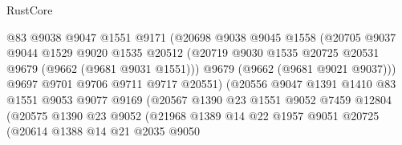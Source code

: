 \begin{lexlean}{RustCore}
\begin{coremodule}
                              @83
                              @9038
                              @9047
                              @1551
                              @9171
                              (@20698
                                @9038
                                @9045
                                @1558
                                (@20705
                                  @9037
                                  @9044
                                  @1529
                                  @9020
                                  @1535
                                  @20512
                                  (@20719
                                    @9030
                                    @1535
                                    @20725
                                    @20531
                                    @9679
                                    (@9662 (@9681 @9031 @1551)))
                                  @9679
                                  (@9662 (@9681 @9021 @9037)))
                                @9697
                                @9701
                                @9706
                                @9711
                                @9717
                                @20551)
                              (@20556
                                @9047
                                @1391
                                @1410
                                @83
                                @1551
                                @9053
                                @9077
                                @9169
                                (@20567
                                  @1390
                                  @23
                                  @1551
                                  @9052
                                  @7459
                                  @12804
                                  (@20575
                                    @1390
                                    @23
                                    @9052
                                    (@21968
                                      @1389
                                      @14
                                      @22
                                      @1957
                                      @9051
                                      @20725
                                      (@20614
                                        @1388
                                        @14
                                        @21
                                        @2035
                                        @9050

\end{coremodule}
\end{lexlean}
